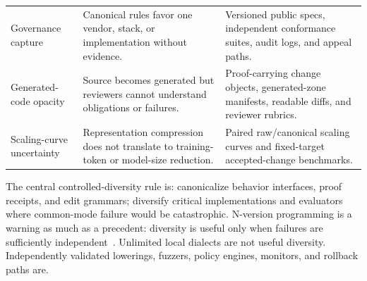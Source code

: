 \begin{table}[t]
\begin{tabularx}{\textwidth}{p{}X X}
Governance capture & Canonical rules favor one vendor, stack, or implementation without evidence. & Versioned public specs, independent conformance suites, audit logs, and appeal paths. \\
Generated-code opacity & Source becomes generated but reviewers cannot understand obligations or failures. & Proof-carrying change objects, generated-zone manifests, readable diffs, and reviewer rubrics. \\
Scaling-curve uncertainty & Representation compression does not translate to training-token or model-size reduction. & Paired raw/canonical scaling curves and fixed-target accepted-change benchmarks. \\
\bottomrule
\end{tabularx}
\end{table}

The central controlled-diversity rule is: canonicalize behavior interfaces, proof receipts, and edit grammars; diversify critical implementations and evaluators where common-mode failure would be catastrophic. N-version programming is a warning as much as a precedent: diversity is useful only when failures are sufficiently independent~\cite{nVersionProgramming}. Unlimited local dialects are not useful diversity. Independently validated lowerings, fuzzers, policy engines, monitors, and rollback paths are.

